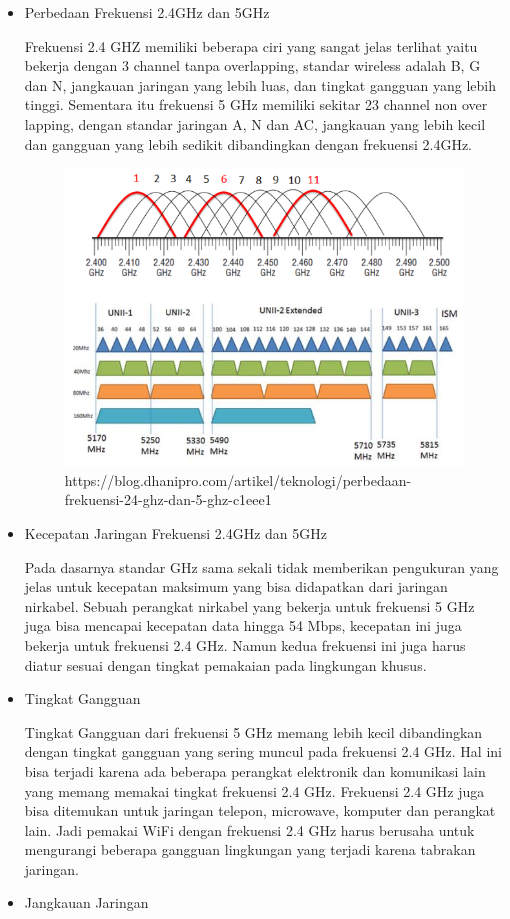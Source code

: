 \documentclass[conference]{IEEEtran}
\begin{document}
\begin{itemize}
    \item Perbedaan Frekuensi 2.4GHz dan 5GHz
    \vspace{2pt}
    
Frekuensi 2.4 GHZ memiliki beberapa ciri yang sangat jelas terlihat yaitu bekerja dengan 3 channel tanpa overlapping, standar wireless adalah B, G dan N, jangkauan jaringan yang lebih luas, dan tingkat gangguan yang lebih tinggi. Sementara itu frekuensi 5 GHz memiliki sekitar 23 channel non over lapping, dengan standar jaringan A, N dan AC, jangkauan yang lebih kecil dan gangguan yang lebih sedikit dibandingkan dengan frekuensi 2.4GHz.
\begin{figure}[h]
\centering
    \includegraphics[width=.4\textwidth]{image/002.png}
     \caption{https://blog.dhanipro.com/artikel/teknologi/perbedaan-frekuensi-24-ghz-dan-5-ghz-c1eee1}
\end{figure}

\item Kecepatan Jaringan Frekuensi 2.4GHz dan 5GHz
\vspace{2pt}

Pada dasarnya standar GHz sama sekali tidak memberikan pengukuran yang jelas untuk kecepatan maksimum yang bisa didapatkan dari jaringan nirkabel. Sebuah perangkat nirkabel yang bekerja untuk frekuensi 5 GHz juga bisa mencapai kecepatan data hingga 54 Mbps, kecepatan ini juga bekerja untuk frekuensi 2.4 GHz. Namun kedua frekuensi ini juga harus diatur sesuai dengan tingkat pemakaian pada lingkungan khusus.
\item Tingkat Gangguan
\vspace{2pt}

Tingkat Gangguan dari frekuensi 5 GHz memang lebih kecil dibandingkan dengan tingkat gangguan yang sering muncul pada frekuensi 2.4 GHz. Hal ini bisa terjadi karena ada beberapa perangkat elektronik dan komunikasi lain yang memang memakai tingkat frekuensi 2.4 GHz. Frekuensi 2.4 GHz juga bisa ditemukan untuk jaringan telepon, microwave, komputer dan perangkat lain. Jadi pemakai WiFi dengan frekuensi 2.4 GHz harus berusaha untuk mengurangi beberapa gangguan lingkungan yang terjadi karena tabrakan jaringan.
\item Jangkauan Jaringan
\vspace{2pt}


\end{itemize}
\end{document}

